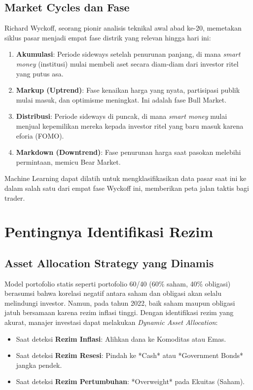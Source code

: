 \documentclass[12pt,a4paper]{book}
\begin{document}
\subsection{Market Cycles dan Fase}
Richard Wyckoff, seorang pionir analisis teknikal awal abad ke-20, memetakan siklus pasar menjadi empat fase distrik yang relevan hingga hari ini:
\begin{enumerate}
    \item \textbf{Akumulasi}: Periode sideways setelah penurunan panjang, di mana \textit{smart money} (institusi) mulai membeli aset secara diam-diam dari investor ritel yang putus asa.
    \item \textbf{Markup (Uptrend)}: Fase kenaikan harga yang nyata, partisipasi publik mulai masuk, dan optimisme meningkat. Ini adalah fase Bull Market.
    \item \textbf{Distribusi}: Periode sideways di puncak, di mana \textit{smart money} mulai menjual kepemilikan mereka kepada investor ritel yang baru masuk karena eforia (FOMO).
    \item \textbf{Markdown (Downtrend)}: Fase penurunan harga saat pasokan melebihi permintaan, memicu Bear Market.
\end{enumerate}
Machine Learning dapat dilatih untuk mengklasifikasikan data pasar saat ini ke dalam salah satu dari empat fase Wyckoff ini, memberikan peta jalan taktis bagi trader.

\section{Pentingnya Identifikasi Rezim}
\subsection{Asset Allocation Strategy yang Dinamis}
Model portofolio statis seperti portofolio 60/40 (60\% saham, 40\% obligasi) berasumsi bahwa korelasi negatif antara saham dan obligasi akan selalu melindungi investor. Namun, pada tahun 2022, baik saham maupun obligasi jatuh bersamaan karena rezim inflasi tinggi.
Dengan identifikasi rezim yang akurat, manajer investasi dapat melakukan \textit{Dynamic Asset Allocation}:
\begin{itemize}
    \item Saat deteksi \textbf{Rezim Inflasi}: Alihkan dana ke Komoditas atau Emas.
    \item Saat deteksi \textbf{Rezim Resesi}: Pindah ke *Cash* atau *Government Bonds* jangka pendek.
    \item Saat deteksi \textbf{Rezim Pertumbuhan}: *Overweight* pada Ekuitas (Saham).
\end{itemize}
\end{document}
